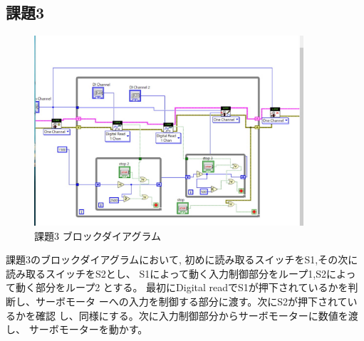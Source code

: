 \documentclass[a4paper,titlepage,11pt]{ltjsarticle}
\begin{document}
\subsection{課題3}
\begin{figure}[H]
  \begin{center}
    \includegraphics[width=100mm]{kadai3_b.pdf}
    \caption{課題3 ブロックダイアグラム}
  \end{center}
\end{figure}
課題3のブロックダイアグラムにおいて,
初めに読み取るスイッチをS1,その次に読み取るスイッチをS2とし、
S1によって動く入力制御部分をループ1,S2によって動く部分をループ2
とする。
最初にDigital readでS1が押下されているかを判断し、サーボモータ
ーへの入力を制御する部分に渡す。次にS2が押下されているかを確認
し、同様にする。次に入力制御部分からサーボモーターに数値を渡し、
サーボモーターを動かす。
\end{document}
